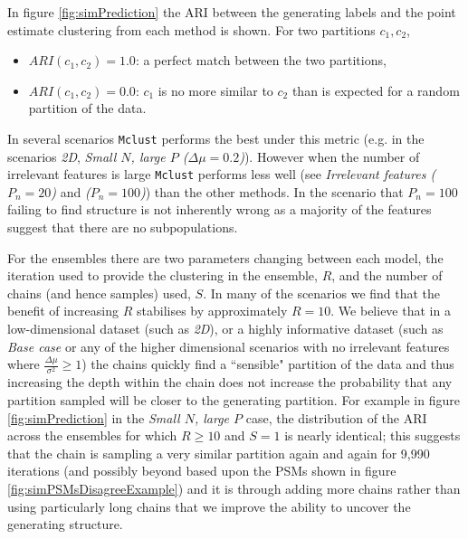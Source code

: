 \documentclass[]{article}
\begin{document}
In figure \ref{fig:simPrediction} the ARI between the generating labels and the point estimate clustering from each method is shown. For two partitions $c_1, c_2$, 
\begin{itemize}
	\item $ARI(c_1, c_2) = 1.0$: a perfect match between the two partitions,
	\item $ARI(c_1, c_2) = 0.0$: $c_1$ is no more similar to $c_2$ than is expected for a random partition of the data.
\end{itemize}
In several scenarios \texttt{Mclust} performs the best under this metric (e.g. in the scenarios \emph{2D}, \emph{Small $N$, large $P$ ($\Delta \mu = 0.2$)}). However when the number of irrelevant features is large \texttt{Mclust} performs less well (see \emph{Irrelevant features ($P_n = 20$)} and \emph{($P_n = 100$)}) than the other methods. In the scenario that $P_n = 100$ failing to find structure is not inherently wrong as a majority of the features suggest that there are no subpopulations.


For the ensembles there are two parameters changing between each model, the iteration used to provide the clustering in the ensemble, $R$, and the number of chains (and hence samples) used, $S$. In many of the scenarios we find that the benefit of increasing $R$ stabilises by approximately $R = 10$. We believe that in a low-dimensional dataset (such as \emph{2D}), or a highly informative dataset (such as \emph{Base case} or any of the higher dimensional scenarios with no irrelevant features where $\frac{\Delta \mu}{\sigma^2} \geq 1$) the chains quickly find a ``sensible" partition of the data and thus increasing the depth within the chain does not increase the probability that any partition sampled will be closer to the generating partition. For example in figure \ref{fig:simPrediction} in the \emph{Small $N$, large $P$} case, the distribution of the ARI across the ensembles for which $R\geq10$ and $S=1$ is nearly identical; this suggests that the chain is sampling a very similar partition again and again for 9,990 iterations (and possibly beyond based upon the PSMs shown in figure \ref{fig:simPSMsDisagreeExample}) and it is through adding more chains rather than using particularly long chains that we improve the ability to uncover the generating structure. 
\end{document}
